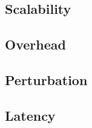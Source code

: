 \subsection{Scalability}



\subsection{Overhead}



\subsection{Perturbation}




\subsection{Latency}




